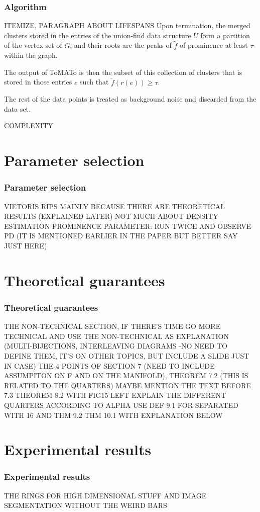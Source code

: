 \documentclass{beamer}
\theoremstyle{definition}
\begin{document}
\begin{frame}
\frametitle{Algorithm}
ITEMIZE, PARAGRAPH ABOUT LIFESPANS
Upon termination, the merged clusters stored in the entries of the union-find data
structure $U$ form a partition of the vertex set of $G$, and their roots are the peaks of $\tilde{f}$
of prominence at least $\tau$ within the graph. 

The output of ToMATo is then the subset of this collection of clusters that is stored in those entries $e$ such that $\tilde{f}(r(e))\geq \tau$. 

The rest of the data points is treated as
background noise and discarded from the data set.
\end{frame}

\begin{frame}
COMPLEXITY
\end{frame}

\section{Parameter selection}
\begin{frame}
\frametitle{Parameter selection}
VIETORIS RIPS MAINLY BECAUSE THERE ARE THEORETICAL RESULTS (EXPLAINED LATER)
NOT MUCH ABOUT DENSITY ESTIMATION
PROMINENCE PARAMETER: RUN TWICE AND OBSERVE PD (IT IS MENTIONED EARLIER IN THE PAPER BUT BETTER SAY JUST HERE)
\end{frame}

\section{Theoretical guarantees}
\begin{frame}
\frametitle{Theoretical guarantees}
THE NON-TECHNICAL SECTION, IF THERE'S TIME GO MORE TECHNICAL AND USE THE NON-TECHNICAL AS EXPLANATION (MULTI-BIJECTIONS, INTERLEAVING DIAGRAMS -NO NEED TO DEFINE THEM, IT'S ON OTHER TOPICS, BUT INCLUDE A SLIDE JUST IN CASE)
THE 4 POINTS OF SECTION 7 (NEED TO INCLUDE ASSUMPITON ON F AND ON THE MANIFOLD), THEOREM 7.2 (THIS IS RELATED TO THE QUARTERS) MAYBE MENTION THE TEXT BEFORE 7.3
THEOREM 8.2 WITH FIG15 LEFT
EXPLAIN THE DIFFERENT QUARTERS ACCORDING TO ALPHA
USE DEF 9.1 FOR SEPARATED WITH 16 AND THM 9.2
THM 10.1 WITH EXPLANATION BELOW
\end{frame}

\section{Experimental results}
\begin{frame}
\frametitle{Experimental results}
THE RINGS FOR HIGH DIMENSIONAL STUFF AND IMAGE SEGMENTATION WITHOUT THE WEIRD BARS
\end{frame}
\end{document}
